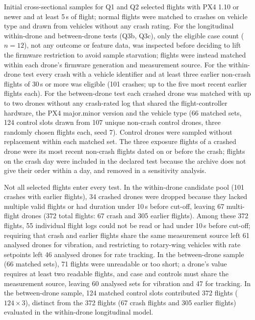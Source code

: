 \documentclass[preprint,12pt]{elsarticle}
\begin{document}
Initial cross-sectional samples for Q1 and Q2 selected flights with PX4 1.10 or newer and at least 5\,s of flight; normal
flights were matched to crashes on vehicle type and drawn from vehicles without any crash rating. For the longitudinal
within-drone and between-drone tests (Q3b, Q3c), only the eligible case count ($n=12$), not any outcome or feature data, was
inspected before deciding to lift the firmware restriction to avoid sample starvation; flights were instead matched
within each drone's firmware generation and measurement source. For the within-drone test every crash with a vehicle identifier
and at least three earlier non-crash flights of 30\,s or more was eligible (101 crashes; up to the five most recent earlier
flights each). For the between-drone test each crashed drone was matched with up to two drones without any crash-rated log
that shared the flight-controller hardware, the PX4 major.minor version and the vehicle type (66 matched sets, 124 control
slots drawn from 107 unique non-crash control drones, three randomly chosen flights each, seed 7). Control drones were sampled
without replacement within each matched set. The three exposure flights of a crashed drone were its most recent non-crash flights
dated on or before the crash; flights on the crash day were included in the declared test because the archive does not give their
order within a day, and removed in a sensitivity analysis.

Not all selected flights enter every test. In the within-drone candidate pool (101 crashes with earlier flights), 34 crashed drones
were dropped because they lacked multiple valid flights or had duration under 10\,s before cut-off, leaving 67 multi-flight drones
(372 total flights: 67 crash and 305 earlier flights). Among these 372 flights, 55 individual flight logs could not be read or had
under 10\,s before cut-off; requiring that crash and earlier flights share the same measurement source left 61 analysed drones for
vibration, and restricting to rotary-wing vehicles with rate setpoints left 46 analysed drones for rate tracking. In the between-drone
sample (66 matched sets), 71 flights were unreadable or too short; a drone's value requires at least two readable flights, and case
and controls must share the measurement source, leaving 60 analysed sets for vibration and 47 for tracking. In the between-drone sample,
124 matched control slots contributed 372 flights ($124 \times 3$), distinct from the 372 flights (67 crash flights and 305 earlier flights)
evaluated in the within-drone longitudinal model.
\end{document}
